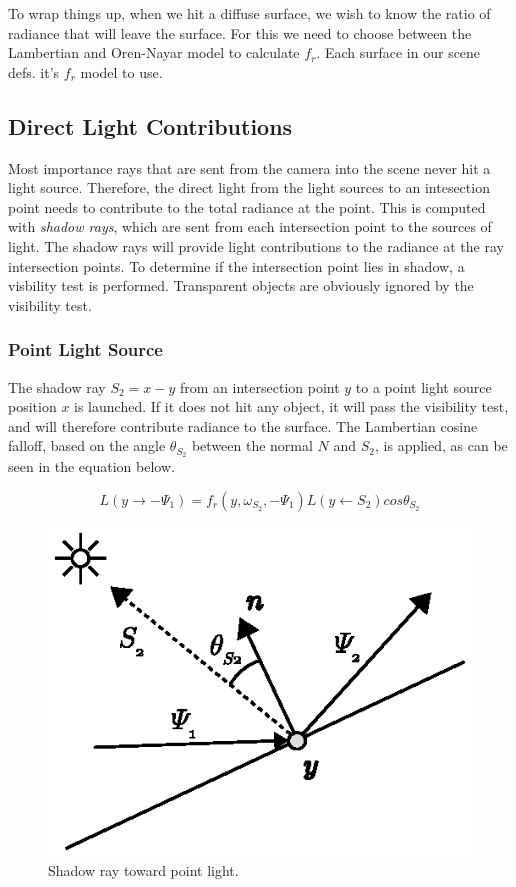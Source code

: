 \documentclass[a4paper, twocolumn]{article}
\begin{document}
                To wrap things up, when we hit a diffuse surface, we wish to know the ratio of radiance that will leave the surface. For this we need to choose between the Lambertian and Oren-Nayar model to calculate \(f_r\). Each surface in our scene defs. it's \(f_r\) model to use.

        \subsection{Direct Light Contributions} \label{sec:direct_light_contributions}
        Most importance rays that are sent from the camera into the scene never hit a light source. Therefore, the direct light from the light sources to an intesection point needs to contribute to the total radiance at the point. This is computed with \emph{shadow rays}, which are sent from each intersection point to the sources of light. The shadow rays will provide light contributions to the radiance at the ray intersection points. To determine if the intersection point lies in shadow, a visbility test is performed. Transparent objects are obviously ignored by the visibility test.
            \subsubsection{Point Light Source} \label{sec:point_light_source}
            The shadow ray $S_2 = x - y$ from an intersection point $y$ to a point light source position $x$ is launched. If it does not hit any object, it will pass the visibility test, and will therefore contribute radiance to the surface. The Lambertian cosine falloff, based on the angle $\theta_{S_2}$ between the normal $N$ and $S_2$, is applied, as can be seen in the equation below.

            \begin{equation*}
              L(y \rightarrow -\Psi_1) = f_r(y, \omega_{S_2}, -\Psi_1) L(y \leftarrow S_2) cos\theta_{S_2}
            \end{equation*}
            
            \begin{figure}[ht]
              \centering
              \includegraphics[width=0.9\linewidth]{share/shadow_ray.eps}
              \caption{Shadow ray toward point light.}
            \end{figure}
\end{document}
